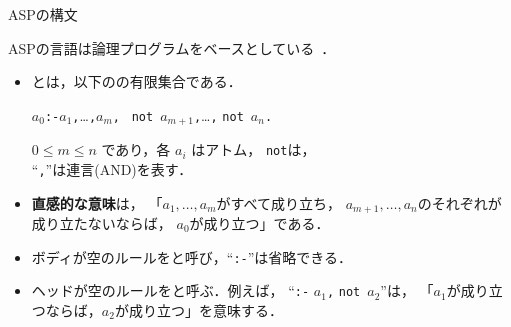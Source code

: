 \documentclass[dvipdfmx,11pt]{beamer}
\newcommand{\code}[1]{\lstinline[basicstyle=\ttfamily]{#1}}
\begin{document}
\begin{frame}{ASPの構文}
  \begin{alertblock}{}\centering
    ASPの言語は論理プログラムをベースとしている~\footnotemark．
  \end{alertblock}
  \begin{itemize}
  \item {}とは，以下のの有限集合である．
    \begin{center}
      \begin{minipage}[c]{0.7\textwidth}
        \begin{block}{}\centering
          $a_0$\quad\code{:-}\quad$a_1$\code{,}\ldots\code{,}$a_m$\code{,}
          \ \code{not}~$a_{m+1}$\code{,}\ldots\code{,} \code{not}~$a_n$\code{.}
        \end{block}        
      \end{minipage}
   \end{center}\vfill
    $0 \leq m \leq n$ であり，各 $a_i$ はアトム，
    \code{not}は，\\
    ``\code{,}''は連言(AND)を表す．
  \item \alert{\bf 直感的な意味}は，
    「$a_1,\ldots,a_m$がすべて成り立ち，
    $a_{m+1},\ldots,a_n$のそれぞれが成り立たないならば，
    $a_0$が成り立つ」である．
  \item ボディが空のルールをと呼び，``\code{:-}''は省略できる．
  \item ヘッドが空のルールをと呼ぶ．例えば，
    ``\code{:-} $a_1$\code{,} \code{not}~$a_{2}$''は，
    「$a_1$が成り立つならば，$a_2$が成り立つ」を意味する．
  \end{itemize}
\end{frame}
\end{document}
